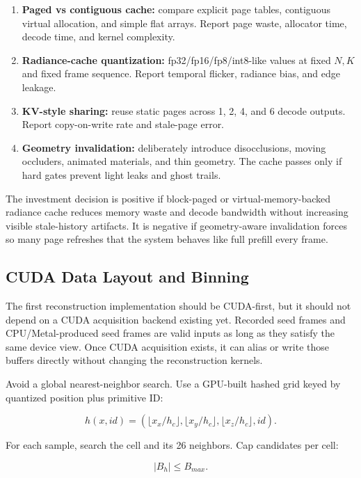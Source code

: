\documentclass[11pt]{article}
\begin{document}
\begin{enumerate}
  \item \textbf{Paged vs contiguous cache:} compare explicit page tables,
        contiguous virtual allocation, and simple flat arrays. Report page
        waste, allocator time, decode time, and kernel complexity.
  \item \textbf{Radiance-cache quantization:} fp32/fp16/fp8/int8-like values at
        fixed $N,K$ and fixed frame sequence. Report temporal flicker,
        radiance bias, and edge leakage.
  \item \textbf{KV-style sharing:} reuse static pages across 1, 2, 4, and 6
        decode outputs. Report copy-on-write rate and stale-page error.
  \item \textbf{Geometry invalidation:} deliberately introduce disocclusions,
        moving occluders, animated materials, and thin geometry. The cache
        passes only if hard gates prevent light leaks and ghost trails.
\end{enumerate}

The investment decision is positive if block-paged or virtual-memory-backed
radiance cache reduces memory waste and decode bandwidth without increasing
visible stale-history artifacts. It is negative if geometry-aware invalidation
forces so many page refreshes that the system behaves like full prefill every
frame.

\subsection{CUDA Data Layout and Binning}

The first reconstruction implementation should be CUDA-first, but it should
not depend on a CUDA acquisition backend existing yet. Recorded seed frames and
CPU/Metal-produced seed frames are valid inputs as long as they satisfy the
same device view. Once CUDA acquisition exists, it can alias or write those
buffers directly without changing the reconstruction kernels.

Avoid a global nearest-neighbor search. Use a GPU-built hashed grid keyed by
quantized position plus primitive ID:

\[
  h(x,id) =
  (\lfloor x_x / h_c \rfloor,
   \lfloor x_y / h_c \rfloor,
   \lfloor x_z / h_c \rfloor,
   id).
\]

For each sample, search the cell and its 26 neighbors. Cap candidates per cell:

\[
  |B_h| \le B_{max}.
\]
\end{document}
